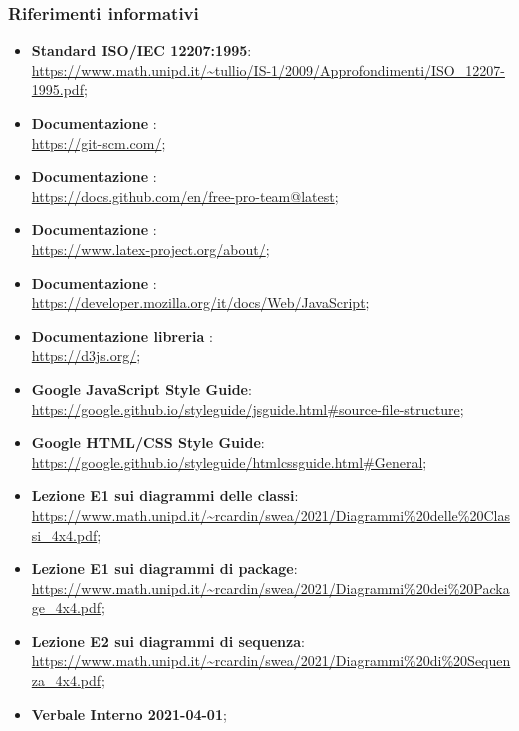\subsubsection{Riferimenti informativi}
\begin{itemize}
    \item \textbf{Standard ISO/IEC 12207:1995}: \\
    \url{https://www.math.unipd.it/~tullio/IS-1/2009/Approfondimenti/ISO_12207-1995.pdf};
    \item \textbf{Documentazione }: \\
    \url{https://git-scm.com/};
    \item \textbf{Documentazione }: \\
    \url{https://docs.github.com/en/free-pro-team@latest};
    \item \textbf{Documentazione \glossario{\LaTeX}}: \\
    \url{https://www.latex-project.org/about/};
    \item \textbf{Documentazione }: \\
    \url{https://developer.mozilla.org/it/docs/Web/JavaScript};
    \item \textbf{Documentazione libreria }: \\
    \url{https://d3js.org/};
	\item \textbf{Google JavaScript Style Guide}: \\
	\url{https://google.github.io/styleguide/jsguide.html#source-file-structure};
	\item \textbf{Google HTML/CSS Style Guide}: \\
	\url{https://google.github.io/styleguide/htmlcssguide.html#General};
    \item \textbf{Lezione E1 sui diagrammi delle classi}: \\
	\url{https://www.math.unipd.it/~rcardin/swea/2021/Diagrammi%20delle%20Classi_4x4.pdf};
    \item \textbf{Lezione E1 sui diagrammi di package}: \\
	\url{https://www.math.unipd.it/~rcardin/swea/2021/Diagrammi%20dei%20Package_4x4.pdf};
    \item \textbf{Lezione E2 sui diagrammi di sequenza}: \\
	\url{https://www.math.unipd.it/~rcardin/swea/2021/Diagrammi%20di%20Sequenza_4x4.pdf};
    \item \textbf{Verbale Interno 2021-04-01};
\end{itemize}
